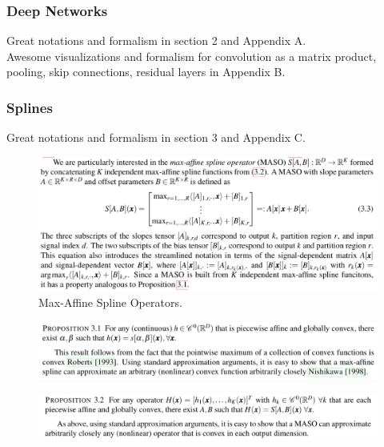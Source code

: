 \documentclass{article}
\begin{document}
\subsubsection{Deep Networks}

Great notations and formalism in section 2 and Appendix A.\\
Awesome visualizations and formalism for convolution as a matrix product, pooling, skip connections, residual layers in Appendix B.


\subsubsection{Splines}

Great notations and formalism in section 3 and Appendix C.\\

\begin{figure}[h]
	\begin{center}
		\includegraphics[width=.8\linewidth]{Figure/def_maso}
			\caption{Max-Affine Spline Operators.}
		\label{fig:def_maso}
	\end{center}
\end{figure}

\begin{figure}[h]
\begin{center}
	\includegraphics[width=.8\linewidth]{Figure/prop3p1}
	\label{fig:prop3p1}
\end{center}
\end{figure}

\begin{figure}[h]
	\begin{center}
		\includegraphics[width=.8\linewidth]{Figure/prop3p2}
		\label{fig:prop3p2}
	\end{center}
\end{figure}
\end{document}
